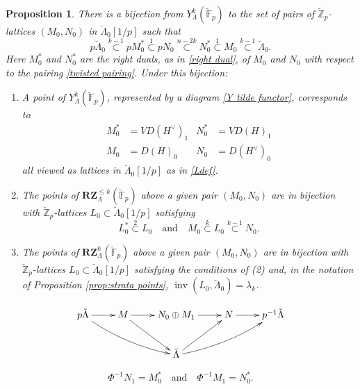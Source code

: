 \documentclass[10pt,a4paper]{amsart}
\newtheorem{proposition}{Proposition}
\newcommand{\F}{\mathbb F}
\newcommand{\Z}{\mathbb Z}
\DeclareMathOperator{\inv}{inv}
\begin{document}
\begin{proposition}\label{prop:RZ tilde points}
There is a   bijection from $Y^k_\Lambda(\breve{\F}_p)$ to the set of pairs of $\breve{\Z}_p$-lattices $(M_0,N_0)$ in $\breve{\Lambda}_0[1/p]$ 
such that
\[
 p\breve{\Lambda}_0 \stackrel{k-1}{\subset}  p M_0^* \stackrel{1}{\subset}  pN_0 \stackrel{n-2k}{\subset}  N_0^* \stackrel{1}{\subset}  M_0 \stackrel{k-1}{\subset} \breve{\Lambda}_0  .
 \]
Here  $M_0^*$ and $N_0^*$ are the right duals, as in \eqref{right dual}, of $M_0$ and $N_0$ with respect to the pairing \eqref{twisted pairing}.
 Under this bijection:
 \begin{enumerate}
 \item
 A point of $Y_\Lambda^k(\breve{\F}_p)$, represented by a diagram \eqref{Y tilde functor}, corresponds to 
 \begin{align*}
 M_0^* &= VD(H^\vee)_1  & N_0^*&= VD(H)_1   \\
   M_0 &= D(H)_0   &     N_0 &= D(H^\vee)_0
 \end{align*}
 all viewed as lattices in $\breve{\Lambda}_0[1/p]$ as in \eqref{Ldef}.
 
 \item
The points of $\mathbf{RZ}^{\le k}_\Lambda(\breve{\F}_p)$ above a given pair $(M_0,N_0)$ are in bijection with $\breve{\Z}_p$-lattices $ L_0 \subset \breve{\Lambda}_0[1/p]$ satisfying
 \[
 L_0^* \stackrel{2}{\subset} L_0\quad \mbox{and}\quad   M_0 \stackrel{k}{\subset} L_0 \stackrel{k-1}{\subset} N_0. 
 \]
 \item
 The points of $\mathbf{RZ}^k_\Lambda(\breve{\F}_p)$ above a given pair $(M_0,N_0)$ are in bijection with $\breve{\Z}_p$-lattices $ L_0 \subset \breve{\Lambda}_0[1/p]$ satisfying the conditions of (2) and, in the notation of  Proposition  \ref{prop:strata points},  $\inv(L_0 , \breve{\Lambda}_0) = \lambda_k$.
 \end{enumerate}
\end{proposition}

\begin{equation}\label{fake minuscule lattices}
\xymatrix{
{p \breve{\Lambda}   }\ar[r]     \ar@/_/[drr]  &  {M} \ar[dr]   \ar[r] & { N_0 \oplus M_1 }  \ar[r] & { N }  \ar[r]  & {p^{-1}  \breve{\Lambda }  } \\
& &  {  \breve{\Lambda} } \ar[ur] \ar@/_/[urr]
}
\end{equation}

\begin{equation}\label{fake dual shift}
\Phi^{-1} N_1 = M_0^* \quad  \mbox{and} \quad  \Phi^{-1} M_1 =N_0^*.
\end{equation}
\end{document}
